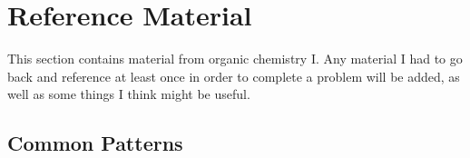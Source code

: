\documentclass{inVerba-notes}
\begin{document}
\hypertarget{ToC}{\tableofcontents}

\chapter{Reference Material}\label{Reference Material}
\begin{adjustwidth}{1cm}{1cm}
  This section contains material from organic chemistry I. Any material I had to go back and reference at least once in order to complete a problem will be added, as well as some things I think might be useful. 
\end{adjustwidth}

\section{Common Patterns}
\end{document}
